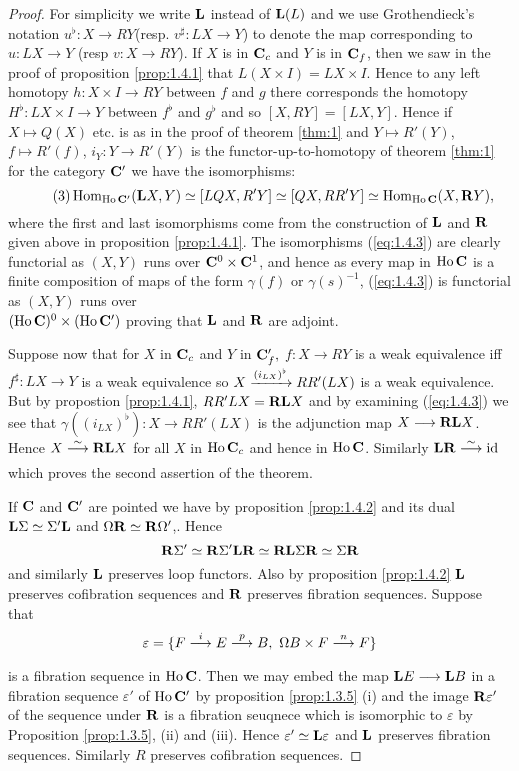 \documentclass[../main]{subfiles}
\begin{document}
\begin{proof}
    For simplicity we write $\mathbf{L}$ instead of $\mathbf{L}(L)$ and we use Grothendieck's notation $u^{\flat}:X\longrightarrow RY$(resp. $v^\sharp:LX\longrightarrow Y$) to denote the map corresponding to $u:LX\longrightarrow Y$ (resp $v:X\longrightarrow RY$). If $X$ is in $\mathbf{C}_c$ and $Y$ is in $\mathbf{C}_f$, then we saw in the proof of proposition \ref{prop:1.4.1} that $L(X\times I)=LX\times I$. Hence to any left homotopy $h:X\times I\longrightarrow RY$ between $f$ and $g$ there corresponds the homotopy $H^\flat:LX\times I\longrightarrow Y$ between $f^\flat$ and $g^\flat$ and so $[X,RY]=[LX,Y]$. Hence if $X\mapsto Q(X)$ etc. is as in the proof of theorem \ref{thm:1} and $Y\mapsto R'(Y)$, $f\mapsto R'(f)$, $i_Y:Y\longrightarrow R'(Y)$ is the functor-up-to-homotopy of theorem \ref{thm:1} for the category $\mathbf{C}'$ we have the isomorphisms:
    \[\tag{3}\label{eq:1.4.3}\operatorname{Hom}_{\operatorname{Ho}\mathbf{C}'}(\mathbf{L} X,Y) \simeq [LQX,R'Y] \simeq [QX,RR'Y] \simeq \operatorname{Hom}_{\operatorname{Ho}\mathbf{C}}(X,\mathbf{R} Y),\]
    where the first and last isomorphisms come from the construction of $\mathbf{L}$ and $\mathbf{R}$ given above in proposition \ref{prop:1.4.1}. The isomorphisms (\ref{eq:1.4.3}) are clearly functorial as $(X,Y)$ runs over $\mathbf{C}^0\times \mathbf{C}^1$, and hence as every map in $\operatorname{Ho}\mathbf{C}$ is a finite composition of maps of the form $\gamma(f)$ or $\gamma(s)^{-1}$, (\ref{eq:1.4.3}) is functorial as $(X,Y)$ runs over \\$(\operatorname{Ho}\mathbf{C})^0\times (\operatorname{Ho}\mathbf{C}')$ proving that $\mathbf{L}$ and $\mathbf{R}$ are adjoint.
    
    Suppose now that for $X$ in $\mathbf{C}_c$ and $Y$ in $\mathbf{C}'_f,$ $f:X\longrightarrow RY$ is a weak equivalence iff $f^\sharp:LX\longrightarrow Y$ is a weak equivalence so $X\varrightarrow{(i_{LX})^\flat}RR'(LX)$ is a weak equivalence. But by propostion \ref{prop:1.4.1}, $RR'LX= \mathbf{R}\mathbf{L} X$ and by examining (\ref{eq:1.4.3}) we see that $\gamma((i_{LX})^\flat):X\longrightarrow RR'(LX)$ is the adjunction map $X\longrightarrow \mathbf{R}\mathbf{L} X$. Hence $X\varrightarrow{\sim}\bR\bL X$ for all $X$ in $\operatorname{Ho}\mathbf{C}_c$ and hence in $\operatorname{Ho}\mathbf{C}$. Similarly $\bL\bR\varrightarrow{\sim}\id$ which proves the second assertion of the theorem.
    
    If $\mathbf{C}$ and $\mathbf{C}'$ are pointed we have by proposition \ref{prop:1.4.2} and its dual $\mathbf{L}\Sigma\simeq \Sigma'\mathbf{L}$ and $\Omega\mathbf{R}\simeq \mathbf{R}\Omega'$,. Hence 
    \[\mathbf{R}\Sigma'\simeq \mathbf{R}\Sigma'\mathbf{L}\mathbf{R}\simeq \mathbf{R}\mathbf{L}\Sigma\mathbf{R}\simeq \Sigma\mathbf{R}\]
    and similarly $\mathbf{L}$ preserves loop functors. Also by proposition \ref{prop:1.4.2} $\mathbf{L}$ preserves cofibration sequences and $\mathbf{R}$ preserves fibration sequences. Suppose that \
    \[\varepsilon= \{F\varrightarrow{i}E\varrightarrow{p}B,\,\, \Omega B\times F\varrightarrow{n}F\}\]
    is a fibration sequence in $\operatorname{Ho}\mathbf{C}$. Then we may embed the map $\mathbf{L} E\longrightarrow \mathbf{L} B$ in a fibration sequence $\varepsilon'$ of $\operatorname{Ho}\mathbf{C}'$ by proposition \ref{prop:1.3.5} (i) and the image $\mathbf{R}\varepsilon'$ of the sequence under $\mathbf{R}$ is a fibration seuqnece which is isomorphic to $\varepsilon$ by Proposition \ref{prop:1.3.5}, (ii) and (iii). Hence $\varepsilon'\simeq \mathbf{L}\varepsilon$ and $\mathbf{L}$ preserves fibration sequences. Similarly $R$ preserves cofibration sequences.
\end{proof}
\end{document}
